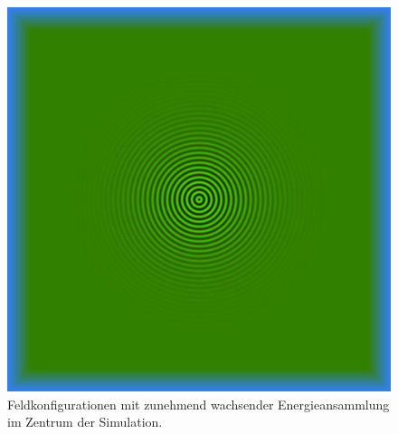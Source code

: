 \begin{figure}
    \includegraphics{papers/particles/figures/wavesim/particle_initial_state.png}
    \caption{Feldkonfigurationen mit zunehmend wachsender Energieansammlung im Zentrum der Simulation.\ }\label{particles:fig:partikel:wachsen}
\end{figure}
